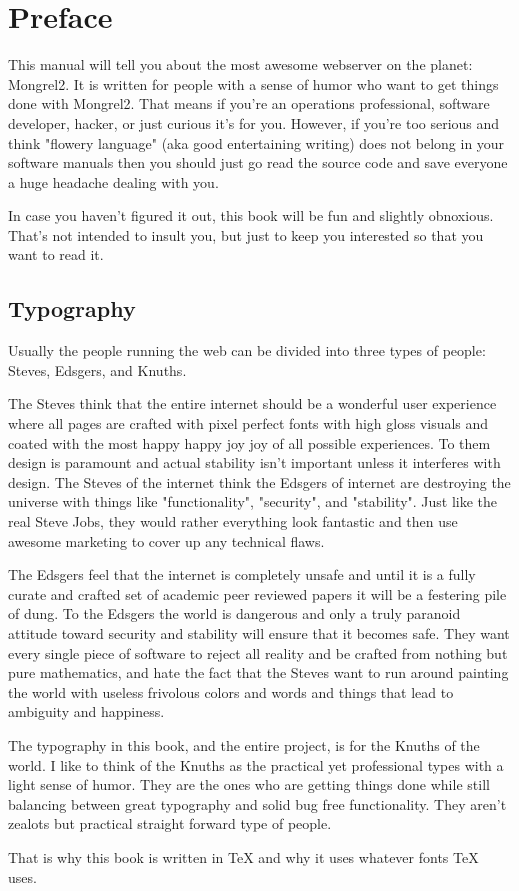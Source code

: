 \chapter{Preface}

This manual will tell you about the most awesome webserver on the planet:
Mongrel2.  It is written for people with a sense of humor who want to get
things done with Mongrel2.  That means if you're an operations professional,
software developer, hacker, or just curious it's for you.  However, if you're
too serious and think "flowery language" (aka good entertaining writing) does
not belong in your software manuals then you should just go read the source
code and save everyone a huge headache dealing with you.

In case you haven't figured it out, this book will be fun and slightly
obnoxious.  That's not intended to insult you, but just to keep you interested
so that you want to read it.


\section{Typography}

Usually the people running the web can be divided into three types of people:  Steves,
Edsgers, and Knuths.

The Steves think that the entire internet should be a wonderful user experience
where all pages are crafted with pixel perfect fonts with high gloss visuals
and coated with the most happy happy joy joy of all possible experiences.  To
them design is paramount and actual stability isn't important unless it
interferes with design.  The Steves of the internet think the Edsgers of
internet are destroying the universe with things like "functionality",
"security", and "stability".  Just like the real Steve Jobs, they would rather
everything look fantastic and then use awesome marketing to cover up any
technical flaws.

The Edsgers feel that the internet is completely unsafe and until it is a fully
curate and crafted set of academic peer reviewed papers it will be a festering
pile of dung.  To the Edsgers the world is dangerous and only a truly paranoid
attitude toward security and stability will ensure that it becomes safe.  They
want every single piece of software to reject all reality and be crafted from
nothing but pure mathematics, and hate the fact that the Steves want to run
around painting the world with useless frivolous colors and words and things
that lead to ambiguity and happiness.

The typography in this book, and the entire project, is for the Knuths of the
world.  I like to think of the Knuths as the practical yet professional types
with a light sense of humor.  They are the ones who are getting things done
while still balancing between great typography and solid bug free
functionality.  They aren't zealots but practical straight forward type of
people.

That is why this book is written in TeX and why it uses whatever fonts TeX uses.




